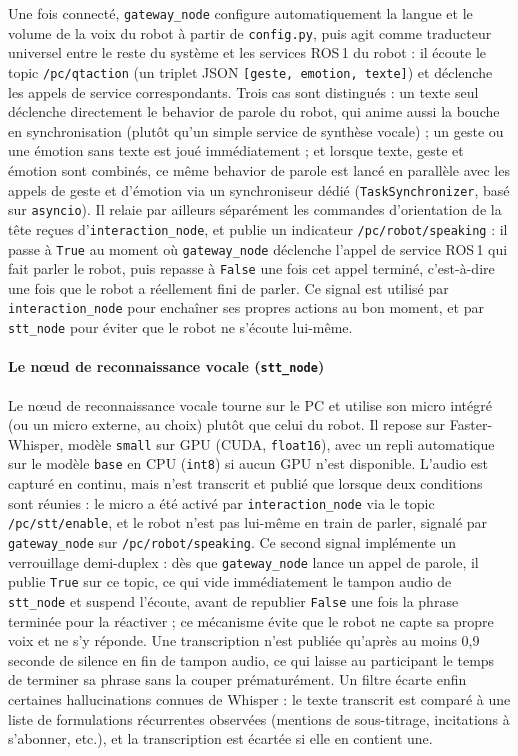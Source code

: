 \documentclass[11pt]{article}
\begin{document}
Une fois connecté, \texttt{gateway\_node} configure automatiquement la langue et le volume de la voix du robot à partir de \texttt{config.py}, puis agit comme traducteur universel entre le reste du système et les services ROS\,1 du robot : il écoute le topic \texttt{/pc/qtaction} (un triplet JSON \texttt{[geste, emotion, texte]}) et déclenche les appels de service correspondants. Trois cas sont distingués : un texte seul déclenche directement le behavior de parole du robot, qui anime aussi la bouche en synchronisation (plutôt qu'un simple service de synthèse vocale) ; un geste ou une émotion sans texte est joué immédiatement ; et lorsque texte, geste et émotion sont combinés, ce même behavior de parole est lancé en parallèle avec les appels de geste et d'émotion via un synchroniseur dédié (\texttt{TaskSynchronizer}, basé sur \texttt{asyncio}). Il relaie par ailleurs séparément les commandes d'orientation de la tête reçues d'\texttt{interaction\_node}, et publie un indicateur \texttt{/pc/robot/speaking} : il passe à \texttt{True} au moment où \texttt{gateway\_node} déclenche l'appel de service ROS\,1 qui fait parler le robot, puis repasse à \texttt{False} une fois cet appel terminé, c'est-à-dire une fois que le robot a réellement fini de parler. Ce signal est utilisé par \texttt{interaction\_node} pour enchaîner ses propres actions au bon moment, et par \texttt{stt\_node} pour éviter que le robot ne s'écoute lui-même.

\paragraph{Le nœud de reconnaissance vocale (\texttt{stt\_node})}

Le nœud de reconnaissance vocale tourne sur le PC et utilise son micro intégré (ou un micro externe, au choix) plutôt que celui du robot. Il repose sur Faster-Whisper, modèle \texttt{small} sur GPU (CUDA, \texttt{float16}), avec un repli automatique sur le modèle \texttt{base} en CPU (\texttt{int8}) si aucun GPU n'est disponible. L'audio est capturé en continu, mais n'est transcrit et publié que lorsque deux conditions sont réunies : le micro a été activé par \texttt{interaction\_node} via le topic \texttt{/pc/stt/enable}, et le robot n'est pas lui-même en train de parler, signalé par \texttt{gateway\_node} sur \texttt{/pc/robot/speaking}. Ce second signal implémente un verrouillage demi-duplex : dès que \texttt{gateway\_node} lance un appel de parole, il publie \texttt{True} sur ce topic, ce qui vide immédiatement le tampon audio de \texttt{stt\_node} et suspend l'écoute, avant de republier \texttt{False} une fois la phrase terminée pour la réactiver ; ce mécanisme évite que le robot ne capte sa propre voix et ne s'y réponde. Une transcription n'est publiée qu'après au moins 0,9\,seconde de silence en fin de tampon audio, ce qui laisse au participant le temps de terminer sa phrase sans la couper prématurément. Un filtre écarte enfin certaines hallucinations connues de Whisper : le texte transcrit est comparé à une liste de formulations récurrentes observées (mentions de sous-titrage, incitations à s'abonner, etc.), et la transcription est écartée si elle en contient une.
\end{document}
